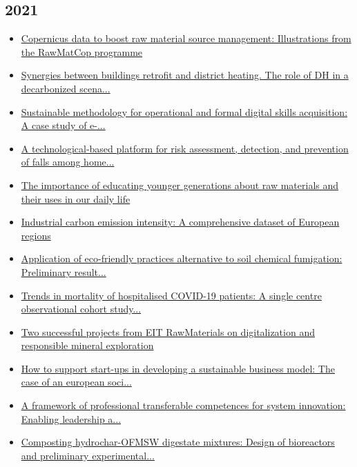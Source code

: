 \subsection*{2021}
\begin{itemize}[leftmargin=*, itemsep=0em, label=\textbullet]
\small
\item \href{https://doi.org/10.1016/j.resourpol.2021.102384}{Copernicus data to boost raw material source management: Illustrations from the RawMatCop programme}
\item \href{https://doi.org/10.1016/j.egyr.2021.08.083}{Synergies between buildings retrofit and district heating. The role of DH in a decarbonized scena...}
\item \href{https://doi.org/10.3390/su13179698}{Sustainable methodology for operational and formal digital skills acquisition: A case study of e-...}
\item \href{https://doi.org/10.2196/25781}{A technological-based platform for risk assessment, detection, and prevention of falls among home...}
\item \href{https://doi.org/10.46763/GEOL21351370027km}{The importance of educating younger generations about raw materials and their uses in our daily life}
\item \href{https://doi.org/10.1016/j.dib.2021.107046}{Industrial carbon emission intensity: A comprehensive dataset of European regions}
\item \href{https://doi.org/10.17660/ActaHortic.2021.1309.66}{Application of eco-friendly practices alternative to soil chemical fumigation: Preliminary result...}
\item \href{https://doi.org/10.1016/j.lanepe.2021.100041}{Trends in mortality of hospitalised COVID-19 patients: A single centre observational cohort study...}
\item \href{https://doi.org/10.1007/s13563-021-00252-9}{Two successful projects from EIT RawMaterials on digitalization and responsible mineral exploration}
\item \href{https://doi.org/10.3390/su13063337}{How to support start-ups in developing a sustainable business model: The case of an european soci...}
\item \href{https://doi.org/10.3390/su13041737}{A framework of professional transferable competences for system innovation: Enabling leadership a...}
\item \href{https://doi.org/10.3390/app11041496}{Composting hydrochar-OFMSW digestate mixtures: Design of bioreactors and preliminary experimental...}

\end{itemize}

